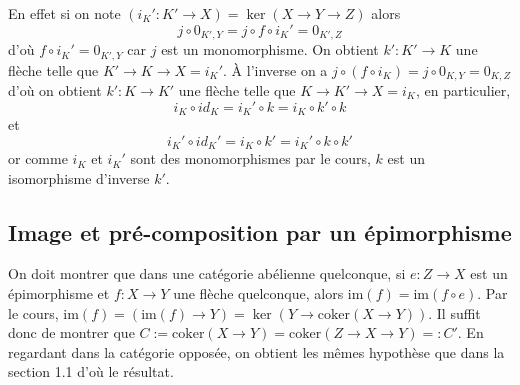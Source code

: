 \documentclass[a4paper,12pt]{article}
\newcommand{\im}{\textrm{im}}
\newcommand{\coker}{\textrm{coker}}
\theoremstyle{plain}
\theoremstyle{definition}
\theoremstyle{remark}
\begin{document}
En effet si on note $(i_K'\colon K'\to X) =\ker(X\to Y\to Z)$ alors 
\[j\circ 0_{K',Y}=j\circ f\circ i_K'=0_{K',Z}\]
d'où $f\circ i_K'=0_{K',Y}$ car $j$ est un monomorphisme. On obtient
$k'\colon K'\to K$ une flèche telle que $K'\to K\to X=i_K'$.
À l'inverse on a $j\circ (f\circ i_K)=j\circ 0_{K, Y}=0_{K, Z}$ d'où 
on obtient $k'\colon K\to K'$ une flèche telle que $K\to K'\to X=i_K$,
en particulier, \[i_K\circ id_K=i_K'\circ k=i_K\circ k'\circ k\] et 
\[i_K'\circ id_K'=i_K\circ k'=i_K'\circ k\circ k'\]
or comme $i_K$ et $i_K'$ sont des monomorphismes
par le cours, $k$ est un isomorphisme d'inverse $k'$. 


\subsection{Image et pré-composition par un épimorphisme}
On doit montrer que dans une catégorie
abélienne quelconque, si $e\colon Z\to X$ est un épimorphisme et 
$f\colon X\to Y$ une flèche quelconque, alors $\im(f)=\im(f\circ e)$.
Par le cours, $\im(f)=(\im(f)\to Y)=\ker(Y\to \coker(X\to Y))$. Il 
suffit donc de montrer que $C:=\coker(X\to Y)=\coker(Z\to X\to Y)=:C'$.
En regardant dans la catégorie opposée, on obtient les mêmes
hypothèse que dans la section 1.1 d'où le résultat.
\end{document}
